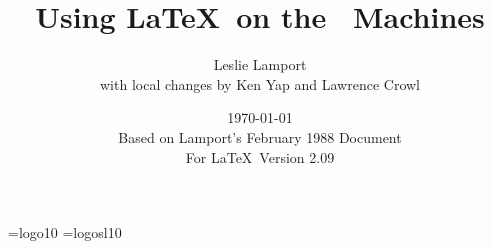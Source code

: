 %
%







\newcommand\bs{\char '134 }  %

\font\logo=logo10 %
\font\logosl=logosl10 %
\def\MF{{\logo META}\-{\logo FONT}}
\def\MFbook{{\sl The {\logosl METAFONT}\kern1pt book}}
\def\ldt{\mathinner{\ldotp\ldotp}}



\title{Using \LaTeX\ on the \UNIX\ Machines}

\author{Leslie Lamport\\
with local changes by Ken Yap and Lawrence Crowl}

\date{\today
\\Based on Lamport's February 1988 Document
\\For \LaTeX\ Version 2.09}


